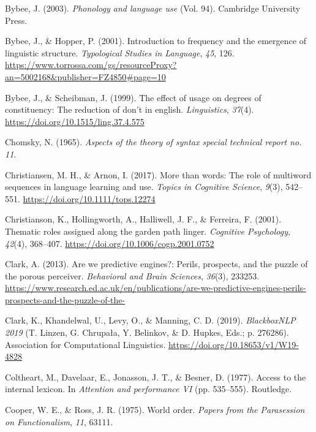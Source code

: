 \documentclass[
  12pt,
  letterpaper,
]{scrreport}
\newlength{\cslhangindent}
\newenvironment{CSLReferences}[2] %
 {\begin{list}{}{%
  \setlength{\itemindent}{0pt}
  \setlength{\leftmargin}{0pt}
  \setlength{\parsep}{0pt}
  \ifodd #1
   \setlength{\leftmargin}{\cslhangindent}
   \setlength{\itemindent}{-1\cslhangindent}
  \fi
  \setlength{\itemsep}{#2\baselineskip}}}
 {\end{list}}
\begin{document}
\begin{CSLReferences}{1}{0}
Bybee, J. (2003). \emph{Phonology and language use} (Vol. 94). Cambridge
University Press.

Bybee, J., \& Hopper, P. (2001). Introduction to frequency and the
emergence of linguistic structure. \emph{Typological Studies in
Language}, \emph{45}, 126.
\url{https://www.torrossa.com/gs/resourceProxy?an=5002168&publisher=FZ4850\#page=10}

Bybee, J., \& Scheibman, J. (1999). The effect of usage on degrees of
constituency: The reduction of don't in english. \emph{Linguistics},
\emph{37}(4). \url{https://doi.org/10.1515/ling.37.4.575}

Chomsky, N. (1965). \emph{Aspects of the theory of syntax special
technical report no. 11}.

Christiansen, M. H., \& Arnon, I. (2017). More than words: The role of
multiword sequences in language learning and use. \emph{Topics in
Cognitive Science}, \emph{9}(3), 542--551.
\url{https://doi.org/10.1111/tops.12274}

Christianson, K., Hollingworth, A., Halliwell, J. F., \& Ferreira, F.
(2001). Thematic roles assigned along the garden path linger.
\emph{Cognitive Psychology}, \emph{42}(4), 368--407.
\url{https://doi.org/10.1006/cogp.2001.0752}

Clark, A. (2013). Are we predictive engines?: Perils, prospects, and the
puzzle of the porous perceiver. \emph{Behavioral and Brain Sciences},
\emph{36}(3), 233253.
\url{https://www.research.ed.ac.uk/en/publications/are-we-predictive-engines-perils-prospects-and-the-puzzle-of-the-}

Clark, K., Khandelwal, U., Levy, O., \& Manning, C. D. (2019).
\emph{BlackboxNLP 2019} (T. Linzen, G. Chrupała, Y. Belinkov, \& D.
Hupkes, Eds.; p. 276286). Association for Computational Linguistics.
\url{https://doi.org/10.18653/v1/W19-4828}

Coltheart, M., Davelaar, E., Jonasson, J. T., \& Besner, D. (1977).
Access to the internal lexicon. In \emph{Attention and performance VI}
(pp. 535--555). Routledge.

Cooper, W. E., \& Ross, J. R. (1975). World order. \emph{Papers from the
Parasession on Functionalism}, \emph{11}, 63111.


\end{CSLReferences}
\end{document}

